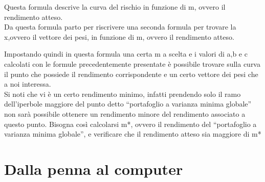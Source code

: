 \noindent
Questa formula descrive la curva del rischio in funzione di m, ovvero il rendimento atteso.\\
Da questa formula parto per riscrivere una seconda formula per trovare la x,ovvero il vettore dei pesi, in funzione di m, ovvero il rendimento atteso.





\noindent
Impostando quindi in questa formula una certa m a scelta e i valori di a,b e c calcolati con le formule precedentemente presentate è possibile trovare sulla curva il punto che possiede il rendimento corrispondente e un certo vettore dei pesi che a noi interessa.\\
Si noti che vi è un certo rendimento minimo, infatti prendendo solo il ramo dell’iperbole maggiore del punto detto “portafoglio a varianza minima globale” non sarà possibile ottenere un rendimento minore del rendimento associato a questo punto. Bisogna così calcolarsi m*, ovvero il rendimento del “portafoglio a varianza minima globale”, e verificare che il rendimento atteso sia maggiore di m*  

\vspace{1cm}
\section{Dalla penna al computer}
